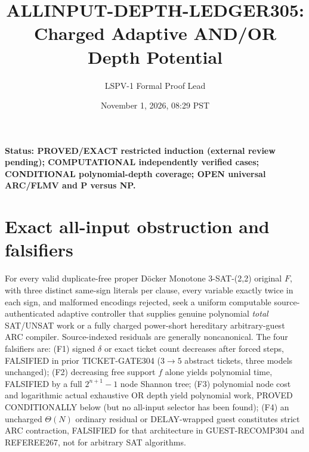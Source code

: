 \documentclass[11pt]{article}
\title{ALLINPUT-DEPTH-LEDGER305: Charged Adaptive AND/OR Depth Potential}
\author{LSPV-1 Formal Proof Lead}\date{November 1, 2026, 08:29 PST}
\begin{document}
\maketitle
\noindent\textbf{Status: PROVED/EXACT restricted induction (external review pending); COMPUTATIONAL independently verified cases; CONDITIONAL polynomial-depth coverage; OPEN universal ARC/FLMV and P versus NP.}
\section{Exact all-input obstruction and falsifiers}
For every valid duplicate-free proper D\"ocker Monotone 3-SAT-(2,2) original $F$, with three distinct same-sign literals per clause, every variable exactly twice in each sign, and malformed encodings rejected, seek a uniform computable source-authenticated adaptive controller that supplies genuine polynomial \emph{total} SAT/UNSAT work or a fully charged power-short hereditary arbitrary-guest ARC compiler. Source-indexed residuals are generally noncanonical. The four falsifiers are: (F1) signed $\delta$ or exact ticket count decreases after forced steps, FALSIFIED in prior TICKET-GATE304 ($3\to5$ abstract tickets, three models unchanged); (F2) decreasing free support $f$ alone yields polynomial time, FALSIFIED by a full $2^{n+1}-1$ node Shannon tree; (F3) polynomial node cost and logarithmic actual exhaustive OR depth yield polynomial work, PROVED CONDITIONALLY below (but no all-input selector has been found); (F4) an uncharged $\Theta(N)$ ordinary residual or DELAY-wrapped guest constitutes strict ARC contraction, FALSIFIED for that architecture in GUEST-RECOMP304 and REFEREE267, not for arbitrary SAT algorithms.
\end{document}
